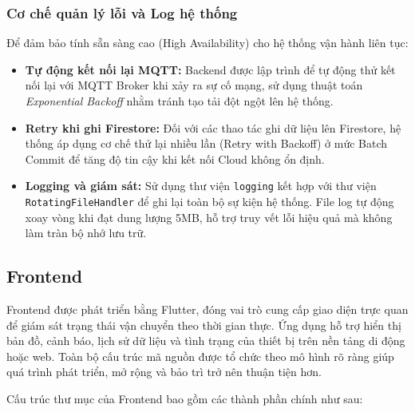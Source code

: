 \subsubsection{Cơ chế quản lý lỗi và Log hệ thống}
Để đảm bảo tính sẵn sàng cao (High Availability) cho hệ thống vận hành liên tục:
\begin{itemize}
    \item \textbf{Tự động kết nối lại MQTT:} Backend được lập trình để tự động thử kết nối lại với MQTT Broker khi xảy ra sự cố mạng, sử dụng thuật toán \textit{Exponential Backoff} nhằm tránh tạo tải đột ngột lên hệ thống.
    \item \textbf{Retry khi ghi Firestore:} Đối với các thao tác ghi dữ liệu lên Firestore, hệ thống áp dụng cơ chế thử lại nhiều lần (Retry with Backoff) ở mức Batch Commit để tăng độ tin cậy khi kết nối Cloud không ổn định.
    \item \textbf{Logging và giám sát:} Sử dụng thư viện \texttt{logging} kết hợp với thư viện \texttt{RotatingFileHandler} để ghi lại toàn bộ sự kiện hệ thống. File log tự động xoay vòng khi đạt dung lượng 5MB, hỗ trợ truy vết lỗi hiệu quả mà không làm tràn bộ nhớ lưu trữ.
\end{itemize}




\subsection{Frontend}

Frontend được phát triển bằng Flutter, đóng vai trò cung cấp giao diện trực quan để giám sát trạng thái vận chuyển theo thời gian thực. Ứng dụng hỗ trợ hiển thị bản đồ, cảnh báo, lịch sử dữ liệu và tình trạng của thiết bị trên nền tảng di động hoặc web. Toàn bộ cấu trúc mã nguồn được tổ chức theo mô hình rõ ràng giúp quá trình phát triển, mở rộng và bảo trì trở nên thuận tiện hơn.

Cấu trúc thư mục của Frontend bao gồm các thành phần chính như sau:

